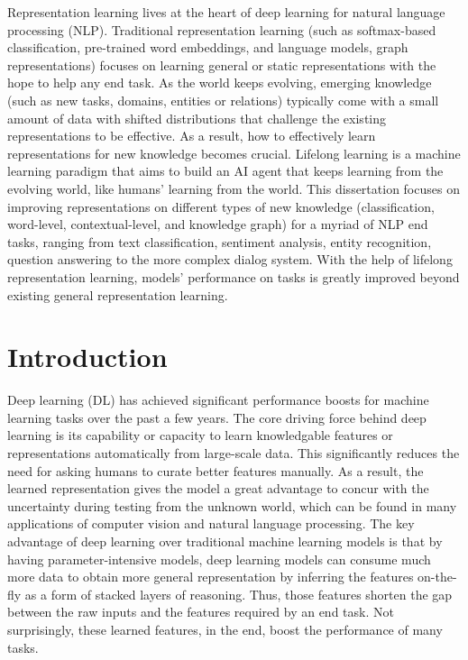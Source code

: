 \summary
Representation learning lives at the heart of deep learning for natural language processing (NLP). 
Traditional representation learning (such as softmax-based classification, pre-trained word embeddings, and language models, graph representations) focuses on learning general or static representations with the hope to help any end task.
As the world keeps evolving, emerging knowledge (such as new tasks, domains, entities or relations) typically come with a small amount of data with shifted distributions that challenge the existing representations to be effective.
As a result, how to effectively learn representations for new knowledge becomes crucial.
Lifelong learning is a machine learning paradigm that aims to build an AI agent that keeps learning from the evolving world, like humans' learning from the world.
This dissertation focuses on improving representations on different types of new knowledge (classification, word-level, contextual-level, and knowledge graph) for a myriad of NLP end tasks, ranging from text classification, sentiment analysis, entity recognition, question answering to the more complex dialog system.
With the help of lifelong representation learning, models' performance on tasks is greatly improved beyond existing general representation learning.

\chapter{Introduction}
\label{chap1:intro}

Deep learning (DL) has achieved significant performance boosts for machine learning tasks over the past a few years\cite{Goodfellow-et-al-2016-Book}. 
The core driving force behind deep learning is its capability or capacity to learn knowledgable features or representations automatically from large-scale data.
This significantly reduces the need for asking humans to curate better features manually.
As a result, the learned representation gives the model a great advantage to concur with the uncertainty during testing from the unknown world, which can be found in many applications of computer vision and natural language processing.
The key advantage of deep learning over traditional machine learning models is that by having parameter-intensive models, deep learning models can consume much more data to obtain more general representation by inferring the features on-the-fly as a form of stacked layers of reasoning. 
Thus, those features shorten the gap between the raw inputs and the features required by an end task.
Not surprisingly, these learned features, in the end, boost the performance of many tasks.

